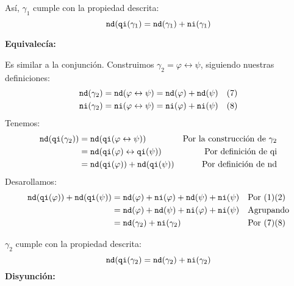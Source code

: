 \documentclass[8pt, letterpaper]{article}
\begin{document}
\begin{enumerate}
   Así, $\gamma_1$ cumple con la propiedad descrita:
   $${\tt nd}({\tt qi}(\gamma_1) = {\tt nd}(\gamma_1) + {\tt ni}(\gamma_1)$$
   
   \hfill\break
   {\bf Equivalecía:}
       
   Es similar a la conjunción. Construimos $\gamma_2 =
   \varphi \leftrightarrow\psi$, siguiendo nuestras definiciones:
   \begin{align*}
     {\tt nd}(\gamma_2) &= {\tt nd}(\varphi\leftrightarrow\psi) =
     {\tt nd}(\varphi) + {\tt nd}(\psi)& (7) \\
     {\tt ni}(\gamma_2) &= {\tt ni}(\varphi\leftrightarrow\psi) =
     {\tt ni}(\varphi) + {\tt ni}(\psi)& (8)
   \end{align*}
   Tenemos:
   \begin{align*}
     {\tt nd}({\tt qi}(\gamma_2)) &= {\tt nd}({\tt qi}(\varphi\leftrightarrow
     \psi))& \text{Por la construcción de } \gamma_2 \\
     &= {\tt nd}({\tt qi}(\varphi)\leftrightarrow{\tt qi}(\psi)) & \text{
       Por definición de qi} \\
     &= {\tt nd}({\tt qi}(\varphi)) + {\tt nd}({\tt qi}(\psi)) &
       \text{ Por definición de nd} \\
   \end{align*}
   Desarollamos:
   \begin{align*}
     {\tt nd}({\tt qi}(\varphi)) + {\tt nd}({\tt qi}(\psi)) &=
     {\tt nd}(\varphi) + {\tt ni}(\varphi)+{\tt nd}(\psi) + {\tt ni}(\psi)
     & &\text{Por } (1)(2)\\
     &= {\tt nd}(\varphi) + {\tt nd}(\psi) + {\tt ni}(\varphi) +
     {\tt ni}(\psi) & &\text{Agrupando}\\
     &=  {\tt nd}(\gamma_2) + {\tt ni}(\gamma_2)& &\text{Por } (7)(8)
     \end{align*}

   $\gamma_2$ cumple con la propiedad descrita:
   $${\tt nd}({\tt qi}(\gamma_2) = {\tt nd}(\gamma_2) + {\tt ni}(\gamma_2)$$
   \hfill\break
   {\bf Disyunción:}


\end{enumerate}
\end{document}
